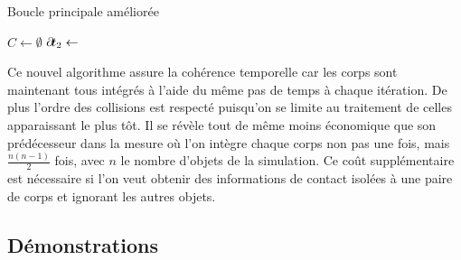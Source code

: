 \begin{algorithm}[h]
  \caption{Boucle principale améliorée}
  \label{algoMoteur2}
  \dontprintsemicolon
  \BlankLine
  $C \leftarrow \emptyset$\;
  \BlankLine
  \;
  $\partial \! t_2 \leftarrow$  
  \BlankLine
  \BlankLine
  \BlankLine
\end{algorithm}

Ce nouvel algorithme assure la cohérence temporelle car les corps sont
maintenant tous intégrés à l'aide du même pas de temps à chaque
itération. De plus l'ordre des collisions est respecté puisqu'on se
limite au traitement de celles apparaissant le plus tôt. Il se révèle
tout de même moins économique que son prédécesseur dans la mesure o\`u
l'on intègre chaque corps non pas une fois, mais $\frac{n(n-1)}{2}$
fois, avec $n$ le nombre d'objets de la simulation. Ce coût
supplémentaire est nécessaire si l'on veut obtenir des informations de
contact isolées à une paire de corps et ignorant les autres objets.

\subsection{Démonstrations}

